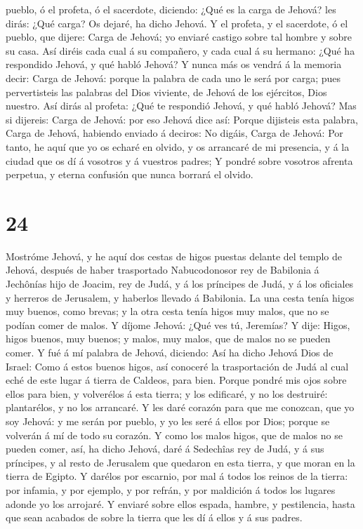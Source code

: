pueblo, ó el profeta, ó el sacerdote, diciendo: ¿Qué es la carga de
Jehová? les dirás: ¿Qué carga? Os dejaré, ha dicho Jehová.
 Y el profeta, y el sacerdote, ó el pueblo, que dijere:
Carga de Jehová; yo enviaré castigo sobre tal hombre y sobre su casa.
 Así diréis cada cual á su compañero, y cada cual á su
hermano: ¿Qué ha respondido Jehová, y qué habló Jehová? 
Y nunca más os vendrá á la memoria decir: Carga de Jehová: porque la
palabra de cada uno le será por carga; pues pervertisteis las palabras
del Dios viviente, de Jehová de los ejércitos, Dios nuestro.
 Así dirás al profeta: ¿Qué te respondió Jehová, y qué
habló Jehová?  Mas si dijereis: Carga de Jehová: por eso
Jehová dice así: Porque dijisteis esta palabra, Carga de Jehová,
habiendo enviado á deciros: No digáis, Carga de Jehová: 
Por tanto, he aquí que yo os echaré en olvido, y os arrancaré de mi
presencia, y á la ciudad que os dí á vosotros y á vuestros padres;
 Y pondré sobre vosotros afrenta perpetua, y eterna
confusión que nunca borrará el olvido.

\hypertarget{section-23}{%
\section{24}\label{section-23}}

 Mostróme Jehová, y he aquí dos cestas de higos puestas
delante del templo de Jehová, después de haber trasportado Nabucodonosor
rey de Babilonia á Jechônías hijo de Joacim, rey de Judá, y á los
príncipes de Judá, y á los oficiales y herreros de Jerusalem, y haberlos
llevado á Babilonia.  La una cesta tenía higos muy buenos,
como brevas; y la otra cesta tenía higos muy malos, que no se podían
comer de malos.  Y díjome Jehová: ¿Qué ves tú, Jeremías? Y
dije: Higos, higos buenos, muy buenos; y malos, muy malos, que de malos
no se pueden comer.  Y fué á mí palabra de Jehová,
diciendo:  Así ha dicho Jehová Dios de Israel: Como á
estos buenos higos, así conoceré la trasportación de Judá al cual eché
de este lugar á tierra de Caldeos, para bien.  Porque
pondré mis ojos sobre ellos para bien, y volverélos á esta tierra; y los
edificaré, y no los destruiré: plantarélos, y no los arrancaré.
 Y les daré corazón para que me conozcan, que yo soy
Jehová: y me serán por pueblo, y yo les seré á ellos por Dios; porque se
volverán á mí de todo su corazón.  Y como los malos higos,
que de malos no se pueden comer, así, ha dicho Jehová, daré á Sedechîas
rey de Judá, y á sus príncipes, y al resto de Jerusalem que quedaron en
esta tierra, y que moran en la tierra de Egipto.  Y
darélos por escarnio, por mal á todos los reinos de la tierra: por
infamia, y por ejemplo, y por refrán, y por maldición á todos los
lugares adonde yo los arrojaré.  Y enviaré sobre ellos
espada, hambre, y pestilencia, hasta que sean acabados de sobre la
tierra que les dí á ellos y á sus padres.

